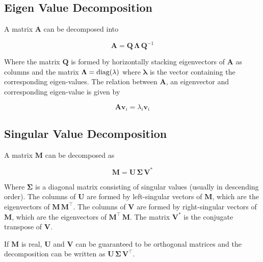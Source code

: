
\subsection*{Eigen Value Decomposition}

A matrix $\mathbf{A}$ can be decomposed into

\begin{equation}
    \mathbf{A} = \mathbf{Q} \, \mathbf{\Lambda} \, \mathbf{Q}^{-1}
    \label{eq:evd-standard}
\end{equation}

Where the matrix $\mathbf{Q}$ is formed by horizontally stacking eigenvectors of $\mathbf{A}$ as columns and the matrix $\mathbf{\Lambda} = \textup{diag}(\mathbf{\lambda})$ where $\mathbf{\lambda}$ is the vector containing the corresponding eigen-values.
The relation between $\mathbf{A}$, an eigenvector and corresponding eigen-value is given by

\begin{equation}
    \mathbf{A} \mathbf{v}_i = \lambda_i \mathbf{v}_i
    \nonumber
\end{equation}

\subsection*{Singular Value Decomposition}

A matrix $\mathbf{M}$ can be decomposed as

\begin{equation}
    \mathbf{M} = \mathbf{U} \, \mathbf{\Sigma} \, \mathbf{V}^{*}
    \label{eq:svd-standard}
\end{equation}

Where $\mathbf{\Sigma}$ is a diagonal matrix consisting of singular values (usually in descending order).
The columns of $\mathbf{U}$ are formed by left-singular vectors of $\mathbf{M}$, which are the eigenvectors of $\mathbf{M} \, \mathbf{M}^\top$.
The columns of $\mathbf{V}$ are formed by right-singular vectors of $\mathbf{M}$, which are the eigenvectors of $\mathbf{M}^\top \, \mathbf{M}$. The matrix $\mathbf{V}^{*}$ is the conjugate transpose of $\mathbf{V}$.

If $\mathbf{M}$ is real, $\mathbf{U}$ and $\mathbf{V}$ can be guaranteed to be orthogonal matrices and the decomposition can be written as $\mathbf{U} \, \mathbf{\Sigma} \, \mathbf{V}^\top$.
